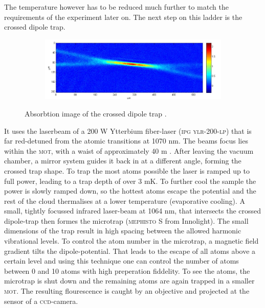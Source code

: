 The temperature however has to be reduced much further to match the requirements of the experiment later on. The next step on this ladder is the crossed dipole trap. \begin{figure}[h]
\centering
\begin{subfigure}[b]{0.8\textwidth}
                \includegraphics[width=\textwidth]{dipolefoto}
\end{subfigure}
\caption{Absorbtion image of the crossed dipole trap \cite{lompe}.}
\label{experiment}
\end{figure}
It uses the laserbeam of a 200 W Ytterbium fiber-laser (\textsc{ipg ylr-200-lp}) that is far red-detuned from the atomic transitions at 1070 nm. The beams focus lies within the \textsc{mot}, with a waist of approximately 40 \mu m \cite{lompe}. After leaving the vacuum chamber, a mirror system guides it back in at a different angle, forming the crossed trap shape. To trap the most atoms possible the laser is ramped up to full power, leading to a trap depth of over 3 mK. To further cool the sample the power is slowly ramped down, so the hottest atoms escape the potential and the rest of the cloud thermalises at a lower temperature (evaporative cooling). A small, tightly focussed infrared laser-beam at 1064 nm, that intersects the crossed dipole-trap then formes the microtrap (\textsc{mephisto S} from Innolight). The small dimensions of the trap result in high spacing between the allowed harmonic vibrational levels. To control the atom number in the microtrap, a magnetic field gradient tilts the dipole-potential. That leads to the escape of all atoms above a certain level and using this technique one can control the number of atoms between 0 and 10 atoms with high preperation fiddelity. To see the atoms, the microtrap is shut down and the remaining atoms are again trapped in a smaller \textsc{mot}. The resulting flourescence is caught by an objective and projected at the sensor of a \textsc{ccd}-camera. 

